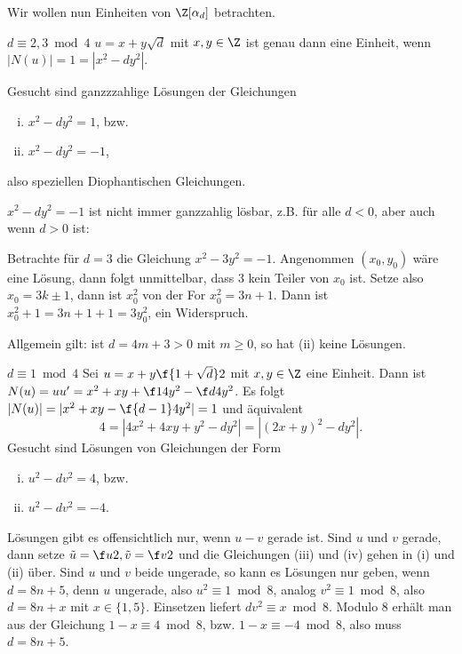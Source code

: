 \begin{nt} \label{4.16}
	Wir wollen nun Einheiten von $\Z[\alpha_d]$ betrachten.
	\begin{seg}{$d \equiv 2, 3 \bmod 4$}
		$u = x + y \sqrt d$ mit $x, y \in \Z$ ist genau dann eine Einheit, wenn $|N(u)| = 1 = |x^2 - dy^2|$.

		Gesucht sind ganzzzahlige Lösungen der Gleichungen
		\begin{enumerate}[(i)]
			\item
				$x^2 - dy^2 = 1$, bzw.
			\item
				$x^2 - dy^2 = -1$,
		\end{enumerate}
		also speziellen Diophantischen Gleichungen.

		$x^2 - dy^2 = -1$ ist nicht immer ganzzahlig lösbar, z.B. für alle $d < 0$, aber auch wenn $d > 0$ ist:

		Betrachte für $d = 3$ die Gleichung $x^2 - 3y^2 = - 1$.
		Angenommen $(x_0, y_0)$ wäre eine Lösung, dann folgt unmittelbar, dass $3$ kein Teiler von $x_0$ ist.
		Setze also $x_0 = 3k \pm 1$, dann ist $x_0^2$ von der For $x_0^2 = 3n + 1$.
		Dann ist $x_0^2 + 1 = 3n + 1 + 1 = 3y_0^2$, ein Widerspruch.

		Allgemein gilt: ist $d = 4m + 3 > 0$ mit $m \ge 0$, so hat (ii) keine Lösungen.
	\end{seg}
	\begin{seg}{$d \equiv 1 \bmod 4$}
		Sei $u = x + y \f {1 + \sqrt d}2$ mit $x,y \in \Z$ eine Einheit.
		Dann ist $N(u) = u u' = x^2 + xy + \f 14 y^2 - \f d4 y^2$.
		Es folgt $|N(u)| = |x^2 + xy - \f {d-1}4 y^2| = 1$ und äquivalent
		\[
			4 = | 4 x^2 + 4xy + y^2 - dy^2 |
			= | (2x + y)^2 - dy^2 |.
		\]
		Gesucht sind Lösungen von Gleichungen der Form
		\begin{enumerate}[(i), start=3]
			\item
				$u^2 - dv^2 = 4$, bzw.
			\item
				$u^2 - dv^2 = -4$.
		\end{enumerate}
		Lösungen gibt es offensichtlich nur, wenn $u - v$ gerade ist.
		Sind $u$ und $v$ gerade, dann setze $\tilde u = \f u2, \tilde v = \f v2$ und die Gleichungen (iii) und (iv) gehen in (i) und (ii) über.
		Sind $u$ und $v$ beide ungerade, so kann es Lösungen nur geben, wenn $d = 8n + 5$, denn $u$ ungerade, also $u^2 \equiv 1 \bmod 8$, analog $v^2 \equiv 1 \bmod 8$, also $d = 8n + x$ mit $x \in \{1, 5\}$.
		Einsetzen liefert $dv^2 \equiv x \bmod 8$.
		Modulo $8$ erhält man aus der Gleichung $1 - x \equiv 4 \bmod 8$, bzw. $1 - x \equiv -4 \bmod 8$, also muss $d = 8n + 5$.
	\end{seg}
\end{nt}

